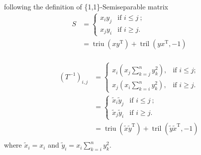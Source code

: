 \documentclass[11pt]{article}
\newcommand{\triu}{\mathop{\mathrm{triu}}}
\newcommand{\tril}{\mathop{\mathrm{tril}}}
\newcommand{\T}{\mathrm{T}}
\begin{document}
following the definition of \{1,1\}-Semiseparable matrix
\begin{align}
    S &= \begin{cases}
        x_{i} y_{j} &  \text{if } i \leqslant j \ ; \\ 
        x_{j} y_{i} &  \text{if } i \geqslant j .
    \end{cases}\\
    &= \triu\left(x y^{\T}\right) + \tril\left(y x^{\T}, -1\right) \\
\end{align}

\begin{align}
    \left( T^{-1} \right)_{i,j} &= 
        \begin{cases}
            x_{i} \left( x_{j} \sum_{k=j}^{n} y_{k}^2 \right) ,&  \text{if } i \leqslant j ; \\ 
            x_{j} \left( x_{i} \sum_{k=i}^{n} y_{k}^2 \right) ,&  \text{if } i \geqslant j .
        \end{cases}\\
        &=  \begin{cases}
            \tilde{x}_{i} \tilde{y}_{j} &  \text{if } i \leqslant j \ ; \\ 
            \tilde{x}_{j} \tilde{y}_{i} &  \text{if } i \geqslant j .
            \end{cases}\\
        &= \triu\left(\tilde{x} \tilde{y}^{\T}\right) + \tril\left(\tilde{y} \tilde{x}^{\T}, -1\right) \\
\end{align}
where $\tilde{x}_{i} = x_{i}$ and $\tilde{y}_{i} = x_{i} \sum_{k=i}^{n} y_{k}^2$.
\end{document}
